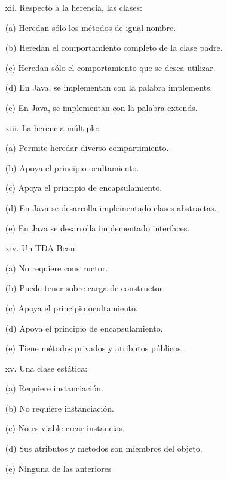 \documentclass[10pt]{article}
\begin{document}
{\begin{enumerate}
\begin{multicols}{2}
    \begin{enumerate}[label=(\alph*)]
        \item[xii.] Respecto a la herencia, las clases:
        \item[(a)] Heredan s\'olo los m\'etodos de igual nombre.
        \item[(b)] Heredan el comportamiento completo de la clase padre.
        \item[(c)] Heredan s\'olo el comportamiento que se desea utilizar.
        \item[(d)] En Java, se implementan con la palabra implements.
        \item[(e)] En Java, se implementan con la palabra extends.
    \end{enumerate}

    \begin{enumerate}[label=(\alph*)]
        \item[xiii.] La herencia m\'ultiple:
        \item[(a)] Permite heredar diverso compartimiento.
        \item[(b)] Apoya el principio ocultamiento.
        \item[(c)] Apoya el principio de encapsulamiento.
        \item[(d)] En Java se desarrolla implementado clases abstractas.
        \item[(e)] En Java se desarrolla implementado interfaces.
    \end{enumerate}

    \begin{enumerate}[label=(\alph*)]
        \item[xiv.] Un TDA Bean:
        \item[(a)] No requiere constructor.
        \item[(b)] Puede tener sobre carga de constructor.
        \item[(c)] Apoya el principio ocultamiento.
        \item[(d)] Apoya el principio de encapsulamiento.
        \item[(e)] Tiene m\'etodos privados y atributos p\'ublicos.
    \end{enumerate}

    \begin{enumerate}[label=(\alph*)]
        \item[xv.] Una clase est\'atica:
        \item[(a)] Requiere instanciaci\'on.
        \item[(b)] No requiere instanciaci\'on.
        \item[(c)] No es viable crear instancias. 
        \item[(d)] Sus atributos y m\'etodos son miembros del objeto.
        \item[(e)] Ninguna de las anteriores
    \end{enumerate}


\end{multicols}
\end{enumerate}}
\end{document}
